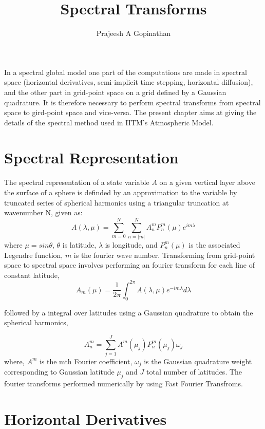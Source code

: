 \documentclass{SBCbookchapter}
\author{Prajeesh A Gopinathan}
\title{Spectral Transforms}
\begin{document}
\maketitle

In a spectral global model one part of the computations are made in spectral space (horizontal derivatives, semi-implicit time stepping, horizontal diffusion), and the other part in grid-point space on a grid defined by a Gaussian quadrature. It is therefore necessary to perform spectral transforms from spectral space to gird-point space and vice-versa. The present chapter aims at giving the details of the spectral method used in IITM's Atmospheric Model.

\section{Spectral Representation}
The spectral representation of a state variable $A$ on a given vertical layer above the surface of a sphere is definded by an approximation to the variable by truncated series of spherical harmonics using a triangular truncation at wavenumber N, given as:
\begin{equation}
A(\lambda,\mu) = \sum_{m=0}^N \sum_{n=|m|}^{N} A_{n}^{m} P_{n}^{m} (\mu) e^{im\lambda}
\end{equation}
 where $\mu=sin\theta$, $\theta$ is latitude, $\lambda$ is longitude, and $P_{n}^{m}(\mu)$ is the associated Legendre function, $m$ is the fourier wave number.
Transforming from grid-point space to spectral space involves performing an fourier transform for each line of constant latitude, 
\begin{equation}
A_{m}(\mu) = \frac{1}{2\pi} \int_{0}^{2\pi} A(\lambda,\mu) e^{-im\lambda} d\lambda
\end{equation}

followed by a integral over latitudes using a Gaussian quadrature to obtain the spherical harmonics,

\begin{equation}
A_{n}^{m} = \sum_{j=1}^{J} A^{m}(\mu_j)P_{n}^{m}(\mu_j) \omega_j
\end{equation}
where, $A^m$ is the mth Fourier coefficient, $\omega_j$ is the Gaussian quadrature weight corresponding to Gaussian latitude $\mu_j$ and $J$ total number of latitudes.
The fourier transforms performed numerically by using Fast Fourier Transfroms.

\section{Horizontal Derivatives}
\end{document}
